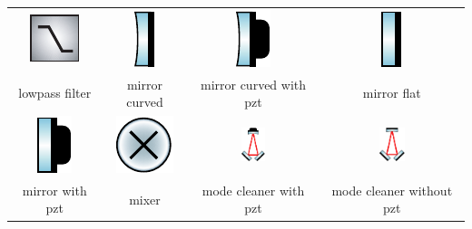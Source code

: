 \begin{table}
\begin{tabular}{|c|c|c|c|}
\includegraphics{contrib/optics_components/lowpass_filter} & 
\includegraphics{contrib/optics_components/mirror_curved} & 
\includegraphics{contrib/optics_components/mirror_curved_with_pzt} &
\includegraphics{contrib/optics_components/mirror_flat}\\
\tiny lowpass filter & 
\tiny mirror curved & 
\tiny mirror curved with pzt &
\tiny mirror flat\\
\hline

\includegraphics{contrib/optics_components/mirror_with_pzt} & 
\includegraphics{contrib/optics_components/mixer} & 
\includegraphics[height=1cm]{contrib/optics_components/mode_cleaner_with_pzt} &
\includegraphics[height=1cm]{contrib/optics_components/mode_cleaner_without_pzt}\\
\tiny mirror with pzt & 
\tiny mixer & 
\tiny mode cleaner with pzt &
\tiny mode cleaner without pzt\\
\hline


\end{tabular}
\end{table}
